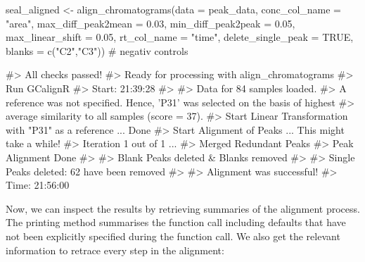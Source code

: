\begin{Schunk}
\begin{Sinput}
seal_aligned <- align_chromatograms(data = peak_data,
                    conc_col_name = "area",
                    max_diff_peak2mean = 0.03,
                    min_diff_peak2peak = 0.05,
                    max_linear_shift = 0.05,
                    rt_col_name = "time",
                    delete_single_peak = TRUE,
                    blanks = c("C2","C3")) # negativ controls
\end{Sinput}
\begin{Soutput}
#> All checks passed!
#> Ready for processing with align_chromatograms
#> Run GCalignR
#> Start: 21:39:28
#> 
#> Data for 84 samples loaded.
#> A reference was not specified. Hence, 'P31' was selected on the basis of highest
#> average similarity to all samples (score = 37).
#> Start Linear Transformation with "P31" as a reference ... Done
#> Start Alignment of Peaks ...  This might take a while!
#> Iteration 1 out of 1  ... 
#> Merged Redundant Peaks
#> Peak Alignment Done 
#> 
#> Blank Peaks deleted & Blanks removed
#> 
#> Single Peaks deleted: 62 have been removed
#> 
#> Alignment was successful!
#> Time: 21:56:00
\end{Soutput}
\end{Schunk}

Now, we can inspect the results by retrieving summaries of the alignment
process. The printing method summarises the function call including
defaults that have not been explicitly specified during the function
call. We also get the relevant information to retrace every step in the
alignment:


